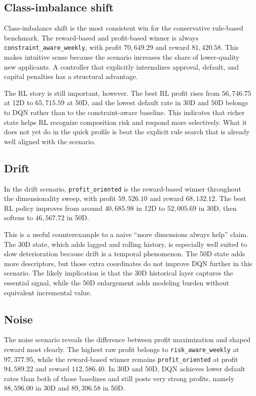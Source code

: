 \documentclass[12pt,a4paper]{article}
\begin{document}
\subsection{Class-imbalance shift}

Class-imbalance shift is the most consistent win for the conservative rule-based benchmark. The reward-based and profit-based winner is always \texttt{constraint\_aware\_weekly}, with profit $70{,}649.29$ and reward $81{,}420.58$. This makes intuitive sense because the scenario increases the share of lower-quality new applicants. A controller that explicitly internalizes approval, default, and capital penalties has a structural advantage.

The RL story is still important, however. The best RL profit rises from $56{,}746.75$ at 12D to $65{,}715.59$ at 50D, and the lowest default rate in 30D and 50D belongs to DQN rather than to the constraint-aware baseline. This indicates that richer state helps RL recognize composition risk and respond more selectively. What it does not yet do in the quick profile is beat the explicit rule search that is already well aligned with the scenario.

\subsection{Drift}

In the drift scenario, \texttt{profit\_oriented} is the reward-based winner throughout the dimensionality sweep, with profit $59{,}526.10$ and reward $68{,}132.12$. The best RL policy improves from around $40{,}685.98$ in 12D to $52{,}005.69$ in 30D, then softens to $46{,}567.72$ in 50D.

This is a useful counterexample to a naive ``more dimensions always help'' claim. The 30D state, which adds lagged and rolling history, is especially well suited to slow deterioration because drift is a temporal phenomenon. The 50D state adds more descriptors, but those extra coordinates do not improve DQN further in this scenario. The likely implication is that the 30D historical layer captures the essential signal, while the 50D enlargement adds modeling burden without equivalent incremental value.

\subsection{Noise}

The noise scenario reveals the difference between profit maximization and shaped reward most clearly. The highest raw profit belongs to \texttt{risk\_aware\_weekly} at $97{,}377.95$, while the reward-based winner remains \texttt{profit\_oriented} at profit $94{,}589.22$ and reward $112{,}586.40$. In 30D and 50D, DQN achieves lower default rates than both of those baselines and still posts very strong profits, namely $88{,}596.00$ in 30D and $89{,}396.58$ in 50D.
\end{document}
